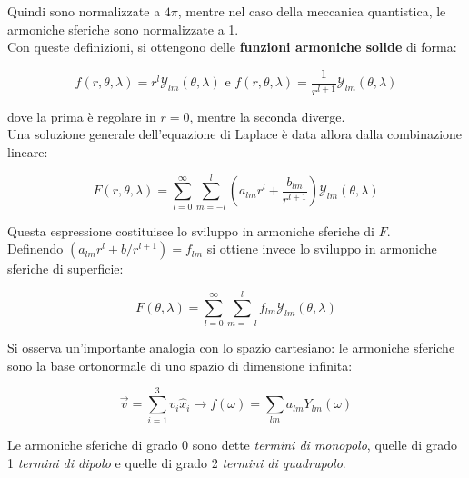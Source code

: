 \documentclass[a4paper,12pt]{book}
\begin{document}
\noindent Quindi sono normalizzate a $4\pi$, mentre nel caso della meccanica quantistica, le armoniche sferiche sono normalizzate a 1.\\

\noindent Con queste definizioni, si ottengono delle \textbf{funzioni armoniche solide} di forma:

\begin{equation}
    f (r, \theta , \lambda) = r^l \mathcal{Y}_{lm} (\theta, \lambda) \text{ e } f (r, \theta , \lambda) = \frac{1}{r^{l+1}} \mathcal{Y}_{lm} (\theta, \lambda)
    \label{eq:armoniche_solide}
\end{equation}

\noindent
dove la prima è regolare in $r=0$, mentre la seconda diverge.\\

\noindent
Una soluzione generale dell'equazione di Laplace è data allora dalla combinazione lineare:

\begin{equation}
    F(r, \theta, \lambda) = \sum_{l=0}^\infty \sum_{m = -l}^l \left(a_{lm} r^l + \frac{b_{lm}}{r^{l+1}} \right) \mathcal{Y}_{lm} (\theta, \lambda)
    \label{eq:soluzione_laplace}
\end{equation}

\noindent
Questa espressione costituisce lo sviluppo in armoniche sferiche di $F$.\\

\noindent
Definendo $(a_{lm} r^l + b/ r^{l+1}) = f_{lm}$ si ottiene invece lo sviluppo in armoniche sferiche di superficie:

\begin{equation}
    F(\theta, \lambda) = \sum_{l=0}^\infty \sum_{m = -l}^l f_{lm} \mathcal{Y}_{lm} (\theta, \lambda)
\end{equation}

\noindent
Si osserva un'importante analogia con lo spazio cartesiano: le armoniche sferiche sono la base ortonormale di uno spazio di dimensione infinita:

\begin{equation}
    \vec{v} = \sum_{i = 1}^3 v_i \hat{x}_i \longrightarrow f(\omega) = \sum_{lm} a_{lm} Y_{lm} (\omega)
\end{equation}

\noindent
Le armoniche sferiche di grado 0 sono dette \textit{termini di monopolo}, quelle di grado 1 \textit{termini di dipolo} e quelle di grado 2 \textit{termini di quadrupolo}.\\
\end{document}
